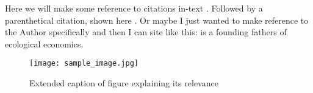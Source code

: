 
\lipsum[30-33]

\vspace{0.5in}

Here we will make some reference to citations in-text \cite{shiklomanov_world_1993}. Followed by a parenthetical citation, shown here \citep{pruyt_making_2009}. Or maybe I just wanted to make reference to the Author specifically and then I can site like this:  is a founding fathers of ecological economics.

\begin{figure}[!htbp]
	\centering
	\texttt{[image: sample\_image.jpg]}
	\caption[Short title of Figure]{Extended caption of figure explaining its relevance}
	\label{fig:sample_fig1}
\end{figure}


